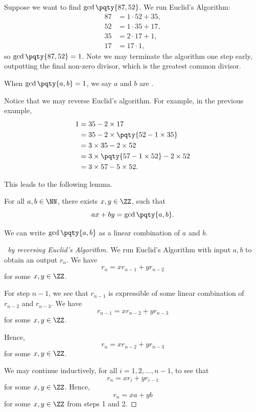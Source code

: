 \begin{example}
    Suppose we want to find \(\gcd\pqty{87, 52}\). We run Euclid's Algorithm:
    \begin{align*}
        87 &= 1 \cdot 52 + 35, \\
        52 &= 1 \cdot 35 + 17, \\
        35 &= 2 \cdot 17 + \boxed{1}, \\
        17 &= 17 \cdot \boxed{1},
    \end{align*}
    so \(\gcd\pqty{87, 52} = 1\). Note we may terminate the algorithm one step early, outputting the final non-zero divisor, which is the greatest common divisor.
\end{example}

\begin{definition}[Coprime]
    When \(\gcd\pqty{a, b} = 1\), we say \(a\) and \(b\) are .
\end{definition}

Notice that we may reverse Euclid's algorithm. For example, in the previous example,
\begin{align*}
    1 &= 35 - 2 \times 17 \\
       &= 35 - 2 \times \pqty{52 - 1 \times 35} \\
       &= 3 \times 35 - 2 \times 52 \\
       &= 3 \times \pqty{57 - 1 \times 52} - 2 \times 52 \\
       &= 3 \times 57 - 5 \times 52.
\end{align*}

This leads to the following lemma.

\begin{theorem}
    For all \(a, b \in \NN\), there exists \(x, y \in \ZZ\), such that
    \[
        ax + by = \gcd\pqty{a, b}.
    \]

    We can write \(\gcd\pqty{a, b}\) as a linear combination of \(a\) and \(b\).
\end{theorem}

\begin{proof}[\proofname\ by reversing Euclid's Algorithm]
    We run Euclid's Algorithm with input \(a, b\) to obtain an output \(r_n\). We have
    \[
        r_n = x r_{n - 1} + y r_{n - 2}
    \]
    for some \(x, y \in \ZZ\).

    For step \(n - 1\), we see that \(r_{n - 1}\) is expressible of some linear combination of \(r_{n - 2}\) and \(r_{n - 3}\). We have
    \[
        r_{n - 1} = x r_{n - 2} + y r_{n - 3}
    \]
    for some \(x, y \in \ZZ\).

    Hence,
    \[
        r_n = x r_{n - 2} + y r_{n - 3}
    \]  
    for some \(x, y \in \ZZ\).

    We may continue inductively, for all \(i = 1, 2, \ldots, n - 1\), to see that
    \[
        r_n = x r_i + y r_{i - 1}
    \]
    for some \(x, y \in \ZZ\). Hence,
    \[
        r_{n} = xa + yb
    \]
    for some \(x, y \in \ZZ\) from steps 1 and 2.
\end{proof}


